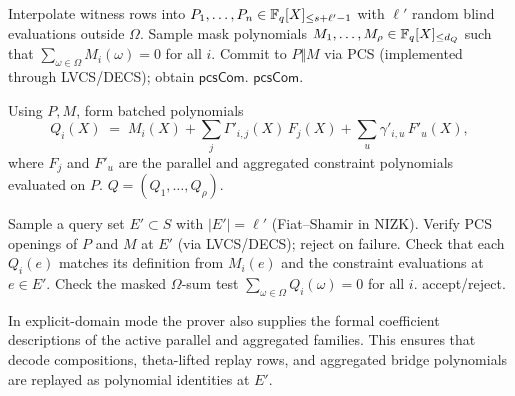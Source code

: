 \begin{algorithm}[H]
\caption{\textsf{PACS.PIOPCommitOracle}\(_{\mathrm{Prover}}(\textsf{params})\to \textsf{pcsCom}\)}
\label{alg:pacs-commitoracle}
\begin{algorithmic}[1]
\State Interpolate witness rows into \(P_1,\ldots,P_n\in\mathbb{F}_q[X]_{\le s+\ell'-1}\) with \(\ell'\) random blind evaluations outside \(\Omega\).
\State Sample mask polynomials \(M_1,\ldots,M_\rho\in\mathbb{F}_q[X]_{\le d_Q}\) such that \(\sum_{\omega\in\Omega} M_i(\omega)=0\) for all \(i\).
\State Commit to \(P\Vert M\) via PCS (implemented through LVCS/DECS); obtain \(\textsf{pcsCom}\).
\State \Return \(\textsf{pcsCom}\).
\end{algorithmic}
\end{algorithm}

\begin{algorithm}[H]
\caption{\textsf{PACS.PIOPBatchCombine}\(_{\mathrm{Prover}}(\textsf{pcsCom},\Gamma')\to Q\)}
\label{alg:pacs-batchcombine}
\begin{algorithmic}[1]
\State Using \(P,M\), form batched polynomials
\[
Q_i(X) \;=\; M_i(X) + \sum_j \Gamma'_{i,j}(X)\,F_j(X) + \sum_u \gamma'_{i,u}\,F'_u(X),
\]
where \(F_j\) and \(F'_u\) are the parallel and aggregated constraint polynomials evaluated on \(P\).
\State \Return \(Q=(Q_1,\ldots,Q_\rho)\).
\end{algorithmic}
\end{algorithm}

\begin{algorithm}[H]
\caption{\textsf{PACS.PIOPOpenAndCheck}(\(\textsf{pcsCom},Q\)) (verifier)}
\label{alg:pacs-openandcheck}
\begin{algorithmic}[1]
\State Sample a query set \(E'\subset S\) with \(|E'|=\ell'\) (Fiat--Shamir in NIZK).
\State Verify PCS openings of \(P\) and \(M\) at \(E'\) (via LVCS/DECS); reject on failure.
\State Check that each \(Q_i(e)\) matches its definition from \(M_i(e)\) and the constraint evaluations at \(e\in E'\).
\State Check the masked \(\Omega\)-sum test \(\sum_{\omega\in\Omega} Q_i(\omega)=0\) for all \(i\).
\State \Return accept/reject.
\end{algorithmic}
\end{algorithm}

In explicit-domain mode the prover also supplies the formal coefficient
descriptions of the active parallel and aggregated families. This ensures that
decode compositions, theta-lifted replay rows, and aggregated bridge
polynomials are replayed as polynomial identities at \(E'\).


